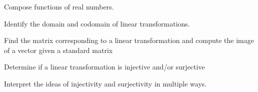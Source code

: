 \begin{readinessAssuranceOutcomes}
\item Compose functions of real numbers.
\item Identify the domain and codomain of linear transformations.
\item Find the matrix corresponding to a linear transformation and compute the image of a vector given a standard matrix 
\item Determine if a linear transformation is injective and/or surjective 
\item Interpret the ideas of injectivity and surjectivity in multiple ways.
\end{readinessAssuranceOutcomes}
